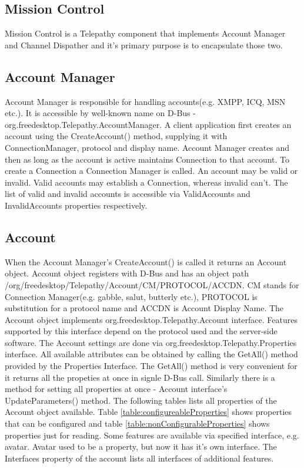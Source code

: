 \subsection*{Mission Control}
Mission Control is a Telepathy component that implements Account Manager and Channel Dispather and it's primary purpose is to encapsulate those two.\cite{tpWikiMissionControl}\cite{tpWikiBasicTerminology}

\subsection*{Account Manager}
Account Manager is responsible for handling accounts(e.g. XMPP, ICQ, MSN etc.). It is accessible by well-known name on D-Bus - org.freedesktop.Telepathy.AccountManager. A client application first creates an account using the CreateAccount() method, supplying it with ConnectionManager, protocol and display name. Account Manager creates and then as long as the account is active maintains Connection to that account. To create a Connection a Connection Manager is called. An account may be valid or invalid. Valid accounts may establish a Connection, whereas invalid can't. The list of valid and invalid accounts is accessible via ValidAccounts and InvalidAccounts properties respectively.\cite{tpWikiBasicTerminology}\cite{tpWikiAccountManager} 

\subsection*{Account}
When the Account Manager's CreateAccount() is called it returns an Account object. Account object registers with D-Bus and has an object path /org/freedesktop/Telepathy/Account/CM/PROTOCOL/ACCDN. CM stands for Connection Manager(e.g. gabble, salut, butterly etc.), PROTOCOL is substitution for a protocol name and ACCDN is Account Display Name. The Account object implements org.freedesktop.Telepathy.Account interface. Features supported by this interface depend on the protocol used and the server-side software. The Account settings are done via org.freedesktop.Telepathy.Properties interface. All available attributes can be obtained by calling the GetAll() method provided by the Properties Interface. The GetAll() method is very convenient for it returns all the propeties at once in signle D-Bus call. Similarly there is a method for setting all properties at once - Account interface's UpdateParameters() method. The following tables lists all properties of the Account object available. Table \ref{table:configureableProperties} shows properties that can be configured and table \ref{table:nonConfigurableProperties} shows properties just for reading. Some features are available via specified interface, e.g. avatar. Avatar used to be a property, but now it has it's own interface. The Interfaces property of the account lists all interfaces of additional features.\cite{tpWikiBasicTerminology}\cite{tpWikiAccount}


